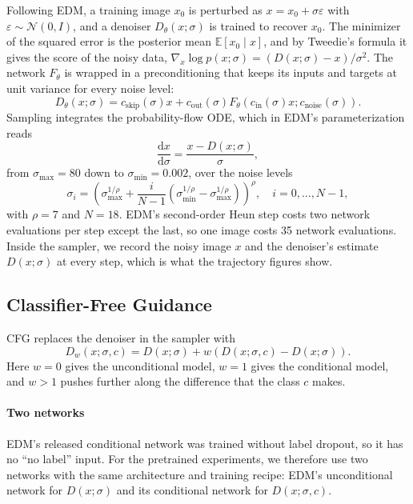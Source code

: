 \documentclass[12pt,letterpaper]{article}
\begin{document}
Following EDM, a training image \(x_0\) is perturbed as \(x = x_0 + \sigma \varepsilon\) with \(\varepsilon \sim \mathcal{N}(0, I)\), and a denoiser \(D_\theta(x; \sigma)\) is trained to recover \(x_0\).
The minimizer of the squared error is the posterior mean \(\mathbb{E}[x_0 \mid x]\), and by Tweedie's formula \citep{efron2011tweedie} it gives the score of the noisy data, \(\nabla_x \log p(x; \sigma) = \left( D(x; \sigma) - x \right) / \sigma^2\).
The network \(F_\theta\) is wrapped in a preconditioning that keeps its inputs and targets at unit variance for every noise level:
\[
    D_\theta(x; \sigma) = c_{\mathrm{skip}}(\sigma) x + c_{\mathrm{out}}(\sigma) F_\theta\left( c_{\mathrm{in}}(\sigma) x; c_{\mathrm{noise}}(\sigma) \right) .
\]
Sampling integrates the probability-flow ODE, which in EDM's parameterization reads
\[
    \frac{\mathrm{d}x}{\mathrm{d}\sigma} = \frac{x - D(x; \sigma)}{\sigma} ,
\]
from \(\sigma_{\max} = 80\) down to \(\sigma_{\min} = 0.002\), over the noise levels
\[
    \sigma_i = \left( \sigma_{\max}^{1/\rho} + \frac{i}{N - 1} \left( \sigma_{\min}^{1/\rho} - \sigma_{\max}^{1/\rho} \right) \right)^{\rho} ,
    \quad i = 0, \dots, N - 1 ,
\]
with \(\rho = 7\) and \(N = 18\).
EDM's second-order Heun step costs two network evaluations per step except the last, so one image costs 35 network evaluations.
Inside the sampler, we record the noisy image \(x\) and the denoiser's estimate \(D(x; \sigma)\) at every step, which is what the trajectory figures show.

\subsection{Classifier-Free Guidance}

CFG \citep{ho2022cfg} replaces the denoiser in the sampler with
\[
    D_w(x; \sigma, c) = D(x; \sigma) + w \left( D(x; \sigma, c) - D(x; \sigma) \right) .
\]
Here \(w = 0\) gives the unconditional model, \(w = 1\) gives the conditional model, and \(w > 1\) pushes further along the difference that the class \(c\) makes.

\paragraph{Two networks}
EDM's released conditional network was trained without label dropout, so it has no ``no label'' input.
For the pretrained experiments, we therefore use two networks with the same architecture and training recipe: EDM's unconditional network for \(D(x; \sigma)\) and its conditional network for \(D(x; \sigma, c)\).
\end{document}
